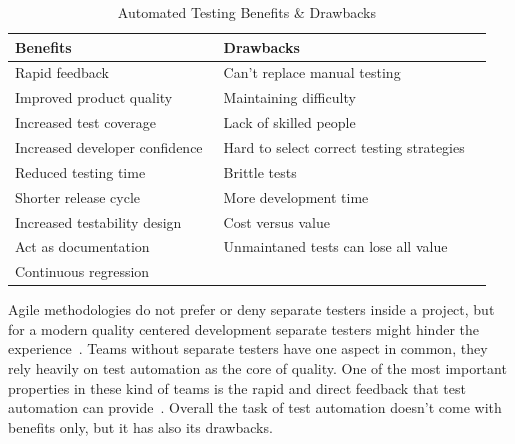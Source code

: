     \begin{table}[H]
        \begin{center}
            \begin{tabular}{ | p{6.3cm} | p{6.3cm} |}
            \hline
            \textbf{Benefits} & \textbf{Drawbacks} \\ \hline
            Rapid feedback~\cite{prechelt2016quality} & Can't replace manual testing~\cite{rafi2012benefits} \\ \hline
            Improved product quality~\cite{rafi2012benefits}~\cite{williams2009effectiveness} & Maintaining difficulty~\cite{rafi2012benefits}~\cite{runeson2006survey} \\ \hline
            Increased test coverage~\cite{rafi2012benefits} & Lack of skilled people~\cite{rafi2012benefits}~\cite{runeson2006survey} \\ \hline
            Increased developer confidence~\cite{rafi2012benefits} & Hard to select correct testing strategies~\cite{rafi2012benefits}~\cite{berner2005observations} \\ \hline
            Reduced testing time~\cite{rafi2012benefits} & Brittle tests~\cite{berner2005observations} \\ \hline
            Shorter release cycle~\cite{berner2005observations} & More development time~\cite{williams2009effectiveness} \\ \hline
            Increased testability design~\cite{berner2005observations} & Cost versus value~\cite{runeson2006survey} \\ \hline
            Act as documentation~\cite{langr2015pragmatic}~\cite{chelimsky2010rspec}~\cite{kapelonis2016java} & Unmaintaned tests can lose all value~\cite{berner2005observations} \\ \hline
            Continuous regression~\cite{williams2009effectiveness} &  \\ \hline
            \end{tabular}
            \caption {Automated Testing Benefits \& Drawbacks} \label{tab:automated-title}
        \end{center}
    \end{table}
    Agile methodologies do not prefer or deny separate testers inside a project, but for a modern quality centered
    development separate testers might hinder the experience~\cite{prechelt2016quality}. Teams without separate testers have one aspect in common,
    they rely heavily on test automation as the core of quality. One of the most important properties in these kind of
    teams is the rapid and direct feedback that test automation can provide~\cite{prechelt2016quality}. Overall the task of test automation
    doesn't come with benefits only, but it has also its drawbacks.


